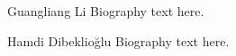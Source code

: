 \documentclass[10pt,journal,compsoc]{IEEEtran}
\begin{document}
\ifCLASSOPTIONcaptionsoff
  \newpage
\fi





%
%


 
%
%
%

% 

\begin{IEEEbiography}{Guangliang Li}
Biography text here.
\end{IEEEbiography}

\begin{IEEEbiography}{Hamdi Dibeklio{\u{g}}lu}
Biography text here.
\end{IEEEbiography}
\end{document}
